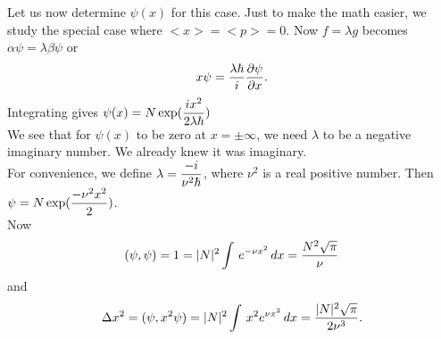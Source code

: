    Let us now determine $\psi(x)$ for this case. Just to make the math easier, we study the special case where $<x> = <p> = 0$. Now $f = \lambda g$ becomes $\alpha \psi = \lambda \beta \psi$ or
   $$x\psi = {\lambda \hbar\over i} {\partial \psi\over \partial x}.$$
   Integrating gives ${\displaystyle \psi(x) = N \exp({ix^2\over 2\lambda \hbar})}$\\
   We see that for $\psi(x)$ to be zero at $x=\pm \infty$, we need $\lambda$ to be a negative imaginary number. We already knew it was imaginary.\\
   For convenience, we define $\lambda = \displaystyle {-i\over \nu^2 \hbar}$, where $\nu^2$ is a real positive number. Then $\displaystyle \psi = N\exp({-\nu^2 x^2\over 2})$. \\
   Now  $$(\psi,\psi) = 1 = |N|^2 \int\, e^{-\nu x^2}\, dx = {N^2\sqrt{\pi}\over \nu}$$ and 
   $$\Delta x^2 = (\psi, x^2\psi) = |N|^2 \int\, x^2 e^{\nu x^2}\, dx = {|N|^2 \sqrt{\pi}\over 2\nu^3}.$$ 
   
   